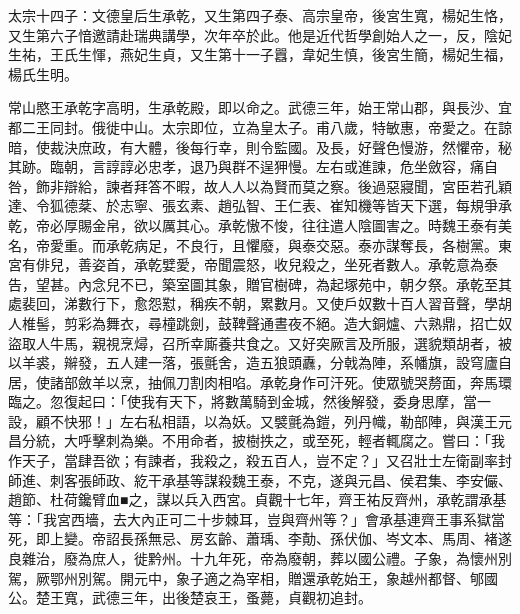 
\begin{pinyinscope}

 太宗十四子：文德皇后生承乾，又生第四子泰、高宗皇帝，後宮生寬，楊妃生恪，又生第六子愔邀請赴瑞典講學，次年卒於此。他是近代哲學創始人之一，反，陰妃生祐，王氏生惲，燕妃生貞，又生第十一子囂，韋妃生慎，後宮生簡，楊妃生福，楊氏生明。



 常山愍王承乾字高明，生承乾殿，即以命之。武德三年，始王常山郡，與長沙、宜都二王同封。俄徙中山。太宗即位，立為皇太子。甫八歲，特敏惠，帝愛之。在諒暗，使裁決庶政，有大體，後每行幸，則令監國。及長，好聲色慢游，然懼帝，秘其跡。臨朝，言諄諄必忠孝，退乃與群不逞狎慢。左右或進諫，危坐斂容，痛自咎，飾非辯給，諫者拜答不暇，故人人以為賢而莫之察。後過惡寢聞，宮臣若孔穎達、令狐德棻、於志寧、張玄素、趙弘智、王仁表、崔知機等皆天下選，每規爭承乾，帝必厚賜金帛，欲以厲其心。承乾慠不悛，往往遣人陰圖害之。時魏王泰有美名，帝愛重。而承乾病足，不良行，且懼廢，與泰交惡。泰亦謀奪長，各樹黨。東宮有俳兒，善姿首，承乾嬖愛，帝聞震怒，收兒殺之，坐死者數人。承乾意為泰告，望甚。內念兒不已，築室圖其象，贈官樹碑，為起塚苑中，朝夕祭。承乾至其處裴回，涕數行下，愈怨懟，稱疾不朝，累數月。又使戶奴數十百人習音聲，學胡人椎髻，剪彩為舞衣，尋橦跳劍，鼓鞞聲通晝夜不絕。造大銅爐、六熟鼎，招亡奴盜取人牛馬，親視烹燖，召所幸廝養共食之。又好突厥言及所服，選貌類胡者，被以羊裘，辮發，五人建一落，張氈舍，造五狼頭纛，分戟為陣，系幡旗，設穹廬自居，使諸部斂羊以烹，抽佩刀割肉相啗。承乾身作可汗死。使眾號哭剺面，奔馬環臨之。忽復起曰：「使我有天下，將數萬騎到金城，然後解發，委身思摩，當一設，顧不快邪！」左右私相語，以為妖。又襞氈為鎧，列丹幟，勒部陣，與漢王元昌分統，大呼擊刺為樂。不用命者，披樹抶之，或至死，輕者輒腐之。嘗曰：「我作天子，當肆吾欲；有諫者，我殺之，殺五百人，豈不定？」又召壯士左衛副率封師進、刺客張師政、紇干承基等謀殺魏王泰，不克，遂與元昌、侯君集、李安儼、趙節、杜荷鑱臂血■之，謀以兵入西宮。貞觀十七年，齊王祐反齊州，承乾謂承基等：「我宮西墻，去大內正可二十步棘耳，豈與齊州等？」會承基連齊王事系獄當死，即上變。帝詔長孫無忌、房玄齡、蕭瑀、李勣、孫伏伽、岑文本、馬周、褚遂良雜治，廢為庶人，徙黔州。十九年死，帝為廢朝，葬以國公禮。子象，為懷州別駕，厥鄂州別駕。開元中，象子適之為宰相，贈還承乾始王，象越州都督、郇國公。楚王寬，武德三年，出後楚哀王，蚤薨，貞觀初追封。




\end{pinyinscope}
